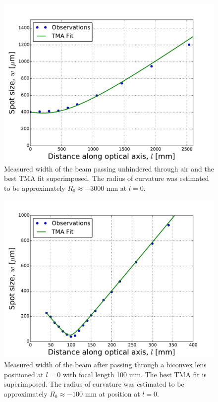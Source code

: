 \documentclass[a4paper, 11pt, notitlepage, english]{article}
\begin{document}
\begin{figure}[p]
\centering
\includegraphics[width=\textwidth]{experiment_1}	
\caption{Measured width of the beam passing unhindered through air and the best TMA fit superimposed. The radius of curvature was estimated to be approximately $R_0 \approx -3000$ mm at $l=0$. \label{fig:e1r1}}
\end{figure}

\begin{figure}[p]
\centering
\includegraphics[width=\textwidth]{experiment_1_wlens}	
\caption{Measured width of the beam after passing through a biconvex lens positioned at $l=0$ with focal length 100 mm. The best TMA fit is superimposed. The radius of curvature was estimated to be approximately $R_0 \approx -100$ mm at position at $l=0$. \label{fig:e1r2}}
\end{figure}
\end{document}
